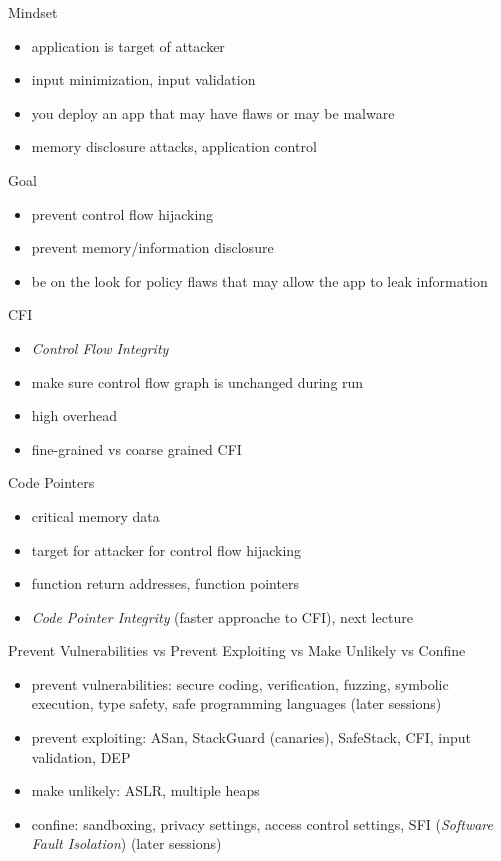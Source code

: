 \documentclass{curs}
\begin{document}
\begin{frame}{Mindset}
  \begin{itemize}
    \item application is target of attacker
    \item input minimization, input validation
    \item you deploy an app that may have flaws or may be malware
    \item memory disclosure attacks, application control
  \end{itemize}
\end{frame}

\begin{frame}{Goal}
  \begin{itemize}
    \item prevent control flow hijacking
    \item prevent memory/information disclosure
    \item be on the look for policy flaws that may allow the app to leak information
  \end{itemize}
\end{frame}

\begin{frame}{CFI}
  \begin{itemize}
    \item \textit{Control Flow Integrity}
    \item make sure control flow graph is unchanged during run
    \item high overhead
    \item fine-grained vs coarse grained CFI
  \end{itemize}
\end{frame}

\begin{frame}{Code Pointers}
  \begin{itemize}
    \item critical memory data
    \item target for attacker for control flow hijacking
    \item function return addresses, function pointers
    \item \textit{Code Pointer Integrity} (faster approache to CFI), next lecture
  \end{itemize}
\end{frame}

\begin{frame}{Prevent Vulnerabilities vs Prevent Exploiting vs Make Unlikely vs Confine}
  \begin{itemize}
    \item prevent vulnerabilities: secure coding, verification, fuzzing, symbolic execution, type safety, safe programming languages (later sessions)
    \item prevent exploiting: ASan, StackGuard (canaries), SafeStack, CFI, input validation, DEP
    \item make unlikely: ASLR, multiple heaps
    \item confine: sandboxing, privacy settings, access control settings, SFI (\textit{Software Fault Isolation}) (later sessions)
  \end{itemize}
\end{frame}
\end{document}

